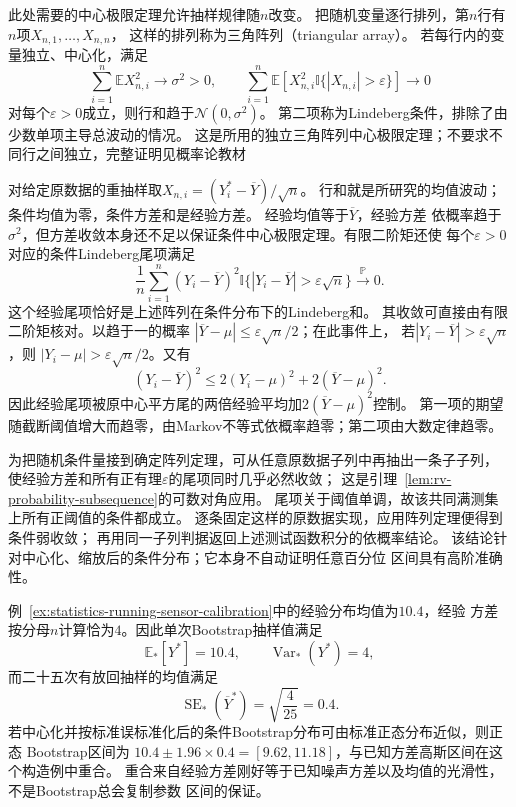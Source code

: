 此处需要的中心极限定理允许抽样规律随\(n\)改变。
把随机变量逐行排列，第\(n\)行有\(n\)项\(X_{n,1},\ldots,X_{n,n}\)，
这样的排列称为三角阵列（triangular array）。
若每行内的变量独立、中心化，满足
\[
 \sum_{i=1}^n\mathbb E X_{n,i}^2\longrightarrow\sigma^2>0,\qquad
 \sum_{i=1}^n\mathbb E\!\left[
 X_{n,i}^2\mathbb I\{|X_{n,i}|>\varepsilon\}\right]\longrightarrow0
\]
对每个\(\varepsilon>0\)成立，则行和趋于\(\mathcal N(0,\sigma^2)\)。
第二项称为Lindeberg条件，排除了由少数单项主导总波动的情况。
这是所用的独立三角阵列中心极限定理；不要求不同行之间独立，完整证明见概率论教材

对给定原数据的重抽样取\(X_{n,i}=(Y_i^\ast-\overline Y)/\sqrt n\)。
行和就是所研究的均值波动；条件均值为零，条件方差和是经验方差。
经验均值等于\(\overline Y\)，经验方差
依概率趋于\(\sigma^2\)，但方差收敛本身还不足以保证条件中心极限定理。有限二阶矩还使
每个\(\varepsilon>0\)对应的条件Lindeberg尾项满足
\[
  \frac1n\sum_{i=1}^n(Y_i-\overline Y)^2
  \mathbb I\{|Y_i-\overline Y|>\varepsilon\sqrt n\}
  \xrightarrow{\mathbb P}0.
\]
这个经验尾项恰好是上述阵列在条件分布下的Lindeberg和。
其收敛可直接由有限二阶矩核对。以趋于一的概率
\(|\overline Y-\mu|\leq\varepsilon\sqrt n/2\)；在此事件上，
若\(|Y_i-\overline Y|>\varepsilon\sqrt n\)，则
\(|Y_i-\mu|>\varepsilon\sqrt n/2\)。又有
\[
 (Y_i-\overline Y)^2\leq2(Y_i-\mu)^2+2(\overline Y-\mu)^2.
\]
因此经验尾项被原中心平方尾的两倍经验平均加\(2(\overline Y-\mu)^2\)控制。
第一项的期望随截断阈值增大而趋零，由Markov不等式依概率趋零；第二项由大数定律趋零。

为把随机条件量接到确定阵列定理，可从任意原数据子列中再抽出一条子子列，
使经验方差和所有正有理\(\varepsilon\)的尾项同时几乎必然收敛；
这是引理~\ref{lem:rv-probability-subsequence}的可数对角应用。
尾项关于阈值单调，故该共同满测集上所有正阈值的条件都成立。
逐条固定这样的原数据实现，应用阵列定理便得到条件弱收敛；
再用同一子列判据返回上述测试函数积分的依概率结论。
该结论针对中心化、缩放后的条件分布；它本身不自动证明任意百分位
区间具有高阶准确性。

例~\ref{ex:statistics-running-sensor-calibration}中的经验分布均值为\(10.4\)，经验
方差按分母\(n\)计算恰为\(4\)。因此单次Bootstrap抽样值满足
\[
  \mathbb{E}_\ast[Y^\ast]=10.4,\qquad
  \operatorname{Var}_\ast(Y^\ast)=4,
\]
而二十五次有放回抽样的均值满足
\[
  \operatorname{SE}_\ast(\overline Y^\ast)
  =
  \sqrt{\frac4{25}}=0.4.
\]
若中心化并按标准误标准化后的条件Bootstrap分布可由标准正态分布近似，则正态
Bootstrap区间为
\(10.4\pm1.96\times0.4=[9.62,11.18]\)，与已知方差高斯区间在这个构造例中重合。
重合来自经验方差刚好等于已知噪声方差以及均值的光滑性，不是Bootstrap总会复制参数
区间的保证。

